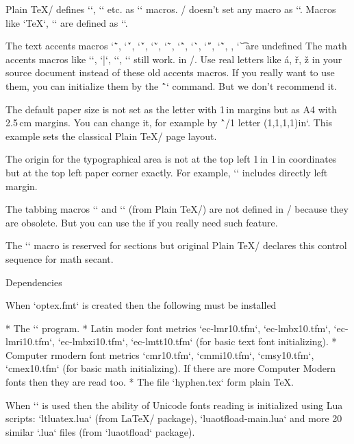 {\new
Plain \TeX/ defines `\newcount`, `\bye` etc. as `\outer` macros. \OpTeX/
doesn't set any macro as `\outer`. Macros like `\TeX`, `\rm` are defined as
`\protected`.

\new
The text accents macros `\"`, `\'`, `\v`, `\u`, `\=`, `\^`, `\.`, `\H`,
`\~`, , `\t`   are undefined\fnote
{The math accents macros like `\acute`, `\bar`, `\dot`, `\hat` still work.}
in \OpTeX/. Use real
letters like á, ř, ž in your source document instead of these old accents macros.
If you really want to use them, you can initialize them by the \^`\oldaccents`
command. But we don't recommend it.

\new
The default paper size is not set as the letter with 1\,in margins but as A4 with
2.5\,cm margins. You can change it, for example by
\^`\margins/1 letter (1,1,1,1)in`. This example sets the classical Plain \TeX/
page layout.

\new
The origin for the typographical area is not at the top left 1\,in 1\,in coordinates
but at the top left paper corner exactly. For example, `\hoffset` includes directly left
margin.

The tabbing macros `\settabs` and `\+` (from Plain \TeX/)
are not defined in \OpTeX/ because they are obsolete. But you can use the
if you really need such feature.

The `\sec` macro is reserved for sections but original Plain \TeX/ declares this
control sequence for math secant.

\enddocument


\sec Dependencies

When `optex.fmt` is created then the following must be installed

\begitems
* The `\luatex` program.
* Latin moder font metrics
  `ec-lmr10.tfm`, `ec-lmbx10.tfm`, `ec-lmri10.tfm`,
  `ec-lmbxi10.tfm`, `ec-lmtt10.tfm` (for basic text font initializing).
* Computer rmodern font metrics
  `cmr10.tfm`, `cmmi10.tfm`, `cmsy10.tfm`, `cmex10.tfm` (for basic math
  initializing). If there are more Computer Modern fonts then they are read
  too.
* The file `hyphen.tex` form plain \TeX.
\enditems

When `\fontfam` is used  then the ability of Unicode fonts reading
is initialized using Lua scripts: `ltluatex.lua` (from \LaTeX/ package),
`luaotfload-main.lua` and more 20 similar `.lua` files (from `luaotfload`
package).

}

